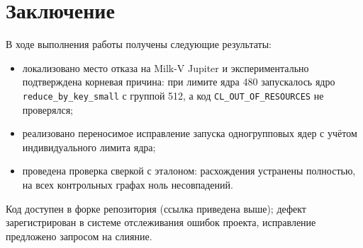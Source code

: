 \documentclass[a4paper]{article}
\begin{document}
\section{Заключение}

В ходе выполнения работы получены следующие результаты:
\begin{itemize}
    \item локализовано место отказа на Milk-V Jupiter и экспериментально подтверждена корневая причина: при лимите ядра 480 запускалось ядро \texttt{reduce\_by\_key\_small} с группой 512, а код \texttt{CL\_OUT\_OF\_RESOURCES} не проверялся;
    \item реализовано переносимое исправление запуска одногрупповых ядер с учётом индивидуального лимита ядра;
    \item проведена проверка сверкой с эталоном: расхождения устранены полностью, на всех контрольных графах ноль несовпадений.
\end{itemize}

Код доступен в форке репозитория (ссылка приведена выше); дефект зарегистрирован в системе отслеживания ошибок проекта, исправление предложено запросом на слияние.
\end{document}
